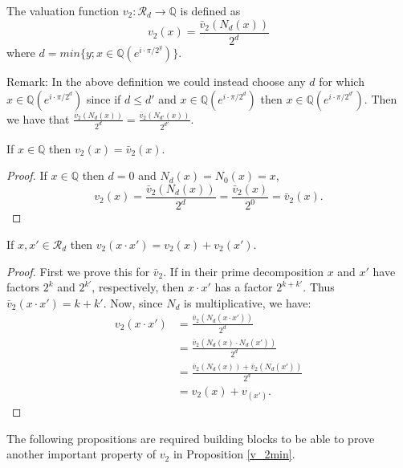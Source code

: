 \documentclass[12pt]{dalthesis}
\begin{document}
\begin{definition}
The valuation function $v_2: \mathcal{R}_d \longrightarrow \mathbb{Q}$ is defined as 
\begin{equation}
v_2 (x) = \frac{\bar{v}_2 (N_d (x))}{2^d}
\end{equation}
where $d = min\{ y; x \in \mathbb{Q} (e^{i \cdot \pi / 2^y })\}$.
\end{definition}

Remark: In the above definition we could instead choose any $d$ for which $x \in \mathbb{Q} (e^{i \cdot \pi / 2^d})$ since if $d \leq d'$ and $x \in \mathbb{Q} (e^{i \cdot \pi / 2^d})$ then $x \in \mathbb{Q} (e^{i \cdot \pi / 2^{d'}})$.
Then we have that $\frac{\bar{v}_2 (N_d (x))}{2^d} = \frac{\bar{v}_2 (N_{d'} (x))}{2^{d'}}$.

\begin{proposition}
If $x \in \mathbb{Q}$ then $v_2 (x) = \bar{v}_2 (x)$.
\end{proposition}
\begin{proof}
If $x \in \mathbb{Q}$ then $d=0$ and $N_d(x) = N_0(x) = x$,  
\begin{equation*}
v_2 (x) = \frac{\bar{v}_2 (N_d (x))}{2^d} = \frac{\bar{v}_2 (x)}{2^0} = \bar{v}_2 (x).
\end{equation*}
\end{proof}

\begin{proposition}
\label{v2additive}
If $x, x' \in \mathcal{R}_d$ then $v_2 (x \cdot x') = v_2 (x) + v_2 (x')$.
\end{proposition}
\begin{proof}
First we prove this for $\bar{v}_2$. If in their prime decomposition $x$ and $x'$ have factors $2^k$ and $2^{k'}$, respectively, then $x \cdot x'$ has a factor $2^{k + k'}$. Thus $\bar{v}_2 (x \cdot x') = k+k'$. Now, since $N_d$ is multiplicative, we have:
\begin{equation*}
\begin{split}
v_2 (x \cdot x') & = \frac{\bar{v}_2 (N_d (x \cdot x'))}{2^d} \\
& = \frac{\bar{v}_2 (N_d (x) \cdot N_d(x'))}{2^d} \\
& = \frac{\bar{v}_2 (N_d(x)) + \bar{v}_2 (N_d(x'))}{2^d} \\ 
& = v_2 (x) + v_(x').
\end{split}
\end{equation*}
\end{proof}

The following propositions are required building blocks to be able to prove another important property of $v_2$ in Proposition \ref{v_2min}.
\end{document}
